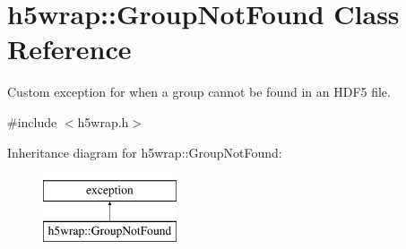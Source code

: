 \hypertarget{classh5wrap_1_1_group_not_found}{}\section{h5wrap\+:\+:Group\+Not\+Found Class Reference}
\label{classh5wrap_1_1_group_not_found}


Custom exception for when a group cannot be found in an H\+D\+F5 file.  




{\ttfamily \#include $<$h5wrap.\+h$>$}

Inheritance diagram for h5wrap\+:\+:Group\+Not\+Found\+:\begin{figure}[H]
\begin{center}
\leavevmode
\includegraphics[height=2.000000cm]{classh5wrap_1_1_group_not_found}
\end{center}
\end{figure}
